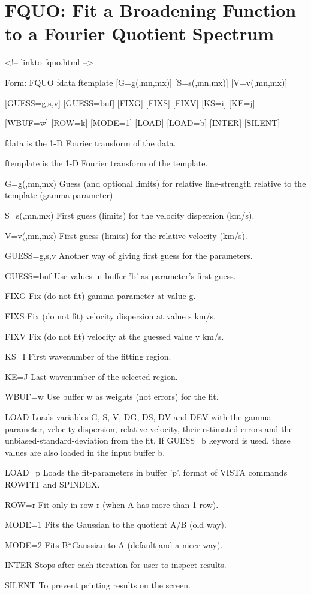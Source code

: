 \section{FQUO: Fit a Broadening Function to a Fourier Quotient Spectrum}
\begin{rawhtml}
<!-- linkto fquo.html -->
\end{rawhtml}
\begin{command}
  \item[Form: FQUO fdata ftemplate {[G=g(,mn,mx)]} {[S=s(,mn,mx)]} 
       {[V=v(,mn,mx)]}\hfill]{}
  \item{{[GUESS=g,s,v]} {[GUESS=buf]} {[FIXG]} {[FIXS]} {[FIXV]} {[KS=i]} 
       {[KE=j]}}
  \item{{[WBUF=w]} {[ROW=k]} {[MODE=1]} {[LOAD]} {[LOAD=b]} {[INTER]} 
       {[SILENT]}}
  \item[fdata]{is the 1-D Fourier transform of the data.}
  \item[ftemplate]{is the 1-D Fourier transform of the template.}
  \item[G=g(,mn,mx)]{Guess (and optional limits) for relative line-strength
       relative to the template (gamma-parameter).}
  \item[S=s(,mn,mx)]{First guess (limits) for the velocity dispersion (km/s).}
  \item[V=v(,mn,mx)]{First guess (limits) for the relative-velocity (km/s).}
  \item[GUESS=g,s,v]{Another way of giving first guess for the parameters.}
  \item[GUESS=buf]{Use values in buffer 'b' as parameter's first guess.}
  \item[FIXG]{Fix (do not fit) gamma-parameter at value g.}
  \item[FIXS]{Fix (do not fit) velocity dispersion at value s km/s.}
  \item[FIXV]{Fix (do not fit) velocity at the guessed value v km/s.}
  \item[KS=I]{First wavenumber of the fitting region.}
  \item[KE=J]{Last wavenumber of the selected region.}
  \item[WBUF=w]{Use buffer w as weights (not errors) for the fit.}
  \item[LOAD]{Loads variables G, S, V, DG, DS, DV and DEV with the
       gamma-parameter, velocity-dispersion, relative velocity,
       their estimated errors and the unbiased-standard-deviation
       from the fit. If GUESS=b keyword is used, these values
       are also loaded in the input buffer b.}
  \item[LOAD=p]{Loads the fit-parameters in buffer 'p'.
       format of VISTA commands ROWFIT and SPINDEX.}
  \item[ROW=r]{Fit only in row r (when A has more than 1 row).}
  \item[MODE=1]{Fits the Gaussian to the quotient A/B (old way).}
  \item[MODE=2]{Fits B*Gaussian to A (default and a nicer way).}
  \item[INTER]{Stops after each iteration for user to inspect results.}
  \item[SILENT]{To prevent printing results on the screen.}
\end{command}

